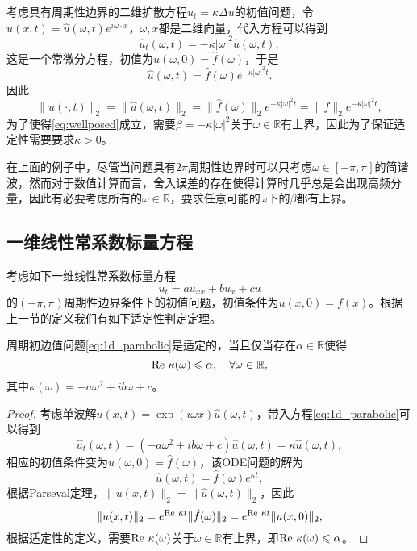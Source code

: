 \documentclass[a4paper,10pt]{ctexart}
\begin{document}
\begin{example}
    考虑具有周期性边界的二维扩散方程$ u_t = \kappa\Delta u $的初值问题，令$ u(x,t) = \hat{u}(\omega,t)e^{i \omega\cdot x} $，$ \omega,x $都是二维向量，代入方程可以得到
    \[
        \hat{u}_t(\omega,t) = -\kappa |\omega|^2 \hat{u}(\omega,t),
    \]
    这是一个常微分方程，初值为$ \hat{u}(\omega,0) = \hat{f}(\omega) $，于是
    \begin{equation}
        \hat{u}(\omega,t) = \hat{f}(\omega)e^{-\kappa |\omega|^2 t}.
    \end{equation}
    因此
    \[
        \| u(\cdot,t) \|_2 = \| \hat{u}(\omega,t) \|_2 = \| \hat{f}(\omega) \|_2 e^{-\kappa |\omega|^2 t} = \| f \|_2 e^{-\kappa |\omega|^2 t},
    \]
    为了使得\eqref{eq:wellposed}成立，需要$ \beta = -\kappa |\omega|^2 $关于$ \omega\in \mathbb{R} $有上界，因此为了保证适定性需要要求$ \kappa >0 $。
\end{example}

在上面的例子中，尽管当问题具有$ 2\pi $周期性边界时可以只考虑$ \omega\in [-\pi,\pi] $的简谐波，然而对于数值计算而言，舍入误差的存在使得计算时几乎总是会出现高频分量，因此有必要考虑所有的$ \omega\in \mathbb{R} $，要求任意可能的$ \omega $下的$ \beta $都有上界。

\subsection{一维线性常系数标量方程}
考虑如下一维线性常系数标量方程
\begin{equation}\label{eq:1d_parabolic}
    u_t = au_{xx} + bu_x + cu
\end{equation}
的$ (-\pi,\pi) $周期性边界条件下的初值问题，初值条件为$ u(x,0)=f(x) $。根据上一节的定义我们有如下适定性判定定理。
\begin{theorem}
    周期初边值问题\eqref{eq:1d_parabolic}是适定的，当且仅当存在$ \alpha\in \mathbb{R} $使得
    \begin{equation}
        {\rm Re}\ \kappa(\omega) \leqslant \alpha,\quad\forall \omega\in \mathbb{R},
    \end{equation}
    其中$ \kappa(\omega) = -a\omega^2 + ib\omega + c $。
\end{theorem}
\begin{proof}
    考虑单波解$ u(x,t) = \exp(i \omega x)\hat{u}(\omega,t) $，带入方程\eqref{eq:1d_parabolic}可以得到
    \[
        \hat{u}_t(\omega,t) = (-a\omega^2 + ib\omega + c)\hat{u}(\omega,t) = \kappa \hat{u}(\omega,t),
    \]
    相应的初值条件变为$ \hat{u}(\omega,0) = \hat{f}(\omega) $，该ODE问题的解为
    \[
        \hat{u}(\omega,t) = \hat{f}(\omega)e^{\kappa t},
    \]
    根据Parseval定理，$ \| u(x,t) \|_2 = \| \hat{u}(\omega,t) \|_2 $，因此
    \[
        \| u(x,t) \|_2 = e^{{\rm Re}\ \kappa t} \| \hat{f}(\omega) \|_2 = e^{{\rm Re}\ \kappa t} \| u(x,0) \|_2,  
    \]
    根据适定性的定义，需要$ {\rm Re}\ \kappa(\omega) $关于$ \omega\in \mathbb{R} $有上界，即$ {\rm Re}\ \kappa(\omega) \leqslant \alpha $。
\end{proof}
\end{document}
